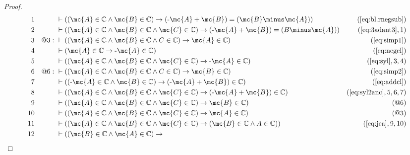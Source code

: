 \begin{proof}
\begin{align}
  1 &&  & \vdash ( ( \mc{A} \in \mathbb{C} \wedge \mc{B} \in \mathbb{C} ) \rightarrow (
     \textrm{-} \mc{A} + \mc{B} ) = ( \mc{B} \minus \mc{A} )
     )&(\mbox{\ref{eq:bl.rnegsub}})\notag
  \\ 2 &&  & \vdash ( ( \mc{A} \in \mathbb{C} \wedge \mc{B} \in \mathbb{C} \wedge \mc{C} \in
     \mathbb{C} ) \rightarrow ( \textrm{-} \mc{A} + \mc{B} ) = ( B
     \minus \mc{A} ) )&(\mbox{\ref{eq:3adant3}},1)\notag
  \\ 3 && @3:\  & \vdash ( ( \mc{A} \in \mathbb{C} \wedge \mc{B} \in \mathbb{C} \wedge C
     \in \mathbb{C} ) \rightarrow \mc{A} \in \mathbb{C}
     )&(\mbox{\ref{eq:simp1}})\notag
  \\ 4 &&  & \vdash ( \mc{A} \in \mathbb{C} \rightarrow \textrm{-} \mc{A} \in \mathbb{C}
     )&(\mbox{\ref{eq:negcl}})\notag
  \\ 5 &&  & \vdash ( ( \mc{A} \in \mathbb{C} \wedge \mc{B} \in \mathbb{C} \wedge \mc{C} \in
     \mathbb{C} ) \rightarrow \textrm{-} \mc{A} \in \mathbb{C}
     )&(\mbox{\ref{eq:syl}},3,4)\notag
  \\ 6 && @6:\  & \vdash ( ( \mc{A} \in \mathbb{C} \wedge \mc{B} \in \mathbb{C} \wedge C
     \in \mathbb{C} ) \rightarrow \mc{B} \in \mathbb{C}
     )&(\mbox{\ref{eq:simp2}})\notag
  \\ 7 &&  & \vdash ( ( \textrm{-} \mc{A} \in \mathbb{C} \wedge \mc{B} \in \mathbb{C} )
     \rightarrow ( \textrm{-} \mc{A} + \mc{B} ) \in \mathbb{C}
     )&(\mbox{\ref{eq:addcl}})\notag
  \\ 8 &&  & \vdash ( ( \mc{A} \in \mathbb{C} \wedge \mc{B} \in \mathbb{C} \wedge \mc{C} \in
     \mathbb{C} ) \rightarrow ( \textrm{-} \mc{A} + \mc{B} ) \in
     \mathbb{C} )&(\mbox{\ref{eq:syl2anc}},5,6,7)\notag
  \\ 9 &&  & \vdash ( ( \mc{A} \in \mathbb{C} \wedge \mc{B} \in \mathbb{C} \wedge \mc{C} \in
     \mathbb{C} ) \rightarrow \mc{B} \in \mathbb{C}
     )&(@6)\notag
  \\ 10 &&  & \vdash ( ( \mc{A} \in \mathbb{C} \wedge \mc{B} \in \mathbb{C} \wedge \mc{C} \in
     \mathbb{C} ) \rightarrow \mc{A} \in \mathbb{C}
     )&(@3)\notag
  \\ 11 &&  & \vdash ( ( \mc{A} \in \mathbb{C} \wedge \mc{B} \in \mathbb{C} \wedge \mc{C} \in
     \mathbb{C} ) \rightarrow ( \mc{B} \in \mathbb{C} \wedge A
     \in \mathbb{C} ) )&(\mbox{\ref{eq:jca}},9,10)\notag
  \\ 12 &&  & \vdash ( ( \mc{B} \in \mathbb{C} \wedge \mc{A} \in \mathbb{C} ) \rightarrow

\end{align}
\end{proof}
